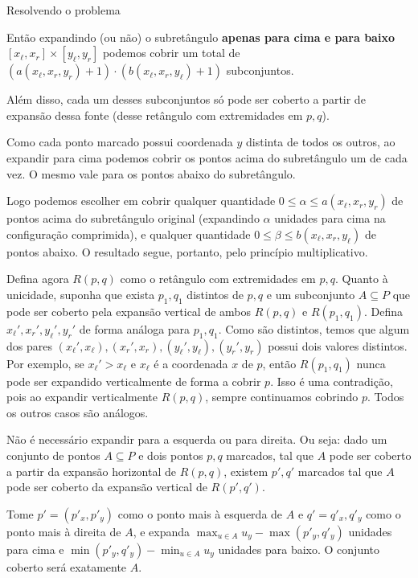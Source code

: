 \documentclass{article}
\begin{document}
\begin{solutionenv}
\begin{generic}{Resolvendo o problema}{}
\begin{lemma}
        Então expandindo (ou não) o subretângulo \textbf{apenas para cima e para baixo} \([x_\ell, x_r] \times [y_\ell, y_r]\) podemos cobrir um total de \((a(x_\ell, x_r, y_r) + 1) \cdot (b(x_\ell, x_r, y_\ell) + 1)\) subconjuntos. 
        
        Além disso, cada um desses subconjuntos só pode ser coberto a partir de expansão dessa fonte (desse retângulo com extremidades em \(p, q\)).
    \end{lemma}
    \begin{proofenv}
        Como cada ponto marcado possui coordenada \(y\) distinta de todos os outros, ao expandir para cima podemos cobrir os pontos acima do subretângulo um de cada vez. O mesmo vale para os pontos abaixo do subretângulo.
        
        Logo podemos escolher em cobrir qualquer quantidade \(0 \leq \alpha \leq a(x_\ell, x_r, y_r)\) de pontos acima do subretângulo original (expandindo \(\alpha\) unidades para cima na configuração comprimida), e qualquer quantidade \(0 \leq \beta \leq b(x_\ell, x_r, y_\ell)\) de pontos abaixo. O resultado segue, portanto, pelo princípio multiplicativo. 

        Defina agora \(R(p, q)\) como o retângulo com extremidades em \(p, q\). Quanto à unicidade,  suponha que exista \(p_1, q_1\) distintos de \(p, q\) e um subconjunto \(A \subseteq P\) que pode ser coberto pela expansão vertical de ambos \(R(p, q)\) e \(R(p_1, q_1)\). Defina \(x_\ell', x_r', y_\ell', y_r'\) de forma análoga para \(p_1, q_1\). Como são distintos, temos que algum dos pares \((x_\ell', x_\ell), (x_r', x_r), (y_\ell', y_\ell), (y_r', y_r)\) possui dois valores distintos. Por exemplo, se \(x_\ell' > x_\ell\) e \(x_\ell\) é a coordenada \(x\) de \(p\), então \(R(p_1, q_1)\) nunca pode ser expandido verticalmente de forma a cobrir \(p\). Isso é uma contradição, pois ao expandir verticalmente \(R(p, q)\), sempre continuamos cobrindo \(p\). Todos os outros casos são análogos.
    \end{proofenv}

    \begin{lemma}
        Não é necessário expandir para a esquerda ou para direita. Ou seja: dado um conjunto de pontos \(A \subseteq P\) e dois pontos \(p, q\) marcados, tal que \(A\) pode ser coberto a partir da expansão horizontal de \(R(p, q)\), existem \(p', q'\) marcados tal que \(A\) pode ser coberto da expansão vertical de \(R(p', q')\).
    \end{lemma}
    \begin{proofenv}
        Tome \(p' = (p'_x, p'_y)\) como o ponto mais à esquerda de \(A\) e \(q' = q'_x, q'_y\) como o ponto mais à direita de \(A\), e expanda \(\max_{u \in A}u_y - \max(p'_y, q'_y)\) unidades para cima e \(\min(p'_y, q'_y) - \min_{u \in A}u_y\) unidades para baixo. O conjunto coberto será exatamente \(A\).
    \end{proofenv}


\end{generic}
\end{solutionenv}
\end{document}
